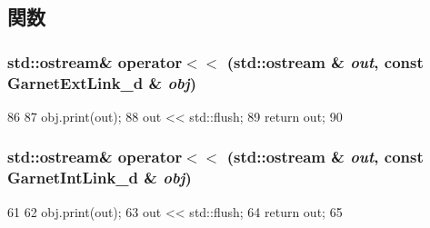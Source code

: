 \subsection{関数}
\hypertarget{GarnetLink__d_8hh_a5478165c5dc34cb799cb3acbde2e2793}{
\subsubsection[{operator$<$$<$}]{\setlength{\rightskip}{0pt plus 5cm}std::ostream\& operator$<$$<$ (std::ostream \& {\em out}, \/  const {\bf GarnetExtLink\_\-d} \& {\em obj})}}
\label{GarnetLink__d_8hh_a5478165c5dc34cb799cb3acbde2e2793}



\begin{DoxyCode}
86 {
87     obj.print(out);
88     out << std::flush;
89     return out;
90 }
\end{DoxyCode}
\hypertarget{GarnetLink__d_8hh_ac0d97547f2e9f572fbd9fb19ae207907}{
\subsubsection[{operator$<$$<$}]{\setlength{\rightskip}{0pt plus 5cm}std::ostream\& operator$<$$<$ (std::ostream \& {\em out}, \/  const {\bf GarnetIntLink\_\-d} \& {\em obj})}}
\label{GarnetLink__d_8hh_ac0d97547f2e9f572fbd9fb19ae207907}



\begin{DoxyCode}
61 {
62     obj.print(out);
63     out << std::flush;
64     return out;
65 }
\end{DoxyCode}
